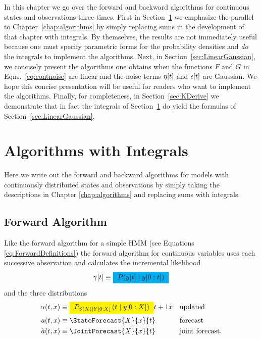 In this chapter we go over the forward and backward algorithms for
continuous states and observations three times.  First in
Section~\ref{sec:integrals} we emphasize the parallel to
Chapter~\ref{chap:algorithms} by simply replacing sums in the
development of that chapter with integrals.  By themselves, the
results are not immediately useful because one must specify parametric
forms for the probability densities and \emph{do} the integrals to
implement the algorithms.  Next, in Section~\ref{sec:LinearGaussian},
we concisely present the algorithms one obtains when the functions $F$
and $G$ in Eqns.~\eqref{eq:contnoise} are linear and the noise terms
${\eta}{[t]}$ and ${\epsilon}{[t]}$ are Gaussian.  We hope this
concise presentation will be useful for readers who want to implement
the algorithms.  Finally, for completeness, in
Section~\ref{sec:KDerive} we demonstrate that in fact the integrals of
Section~\ref{sec:integrals} do yield the formulas of
Section~\ref{sec:LinearGaussian}.

\section{Algorithms with Integrals}
\label{sec:integrals}

Here we write out the forward and backward algorithms for models with
continuously distributed states and observations by simply taking the
descriptions in Chapter \ref{chap:algorithms} and replacing sums with
integrals.

\subsection{Forward Algorithm}

Like the forward algorithm for a simple HMM (see Equations
\eqref{eq:ForwardDefinitions}) the forward algorithm for continuous
variables uses each successive observation and calculates the incremental
likelihood
\begin{equation*}
  \ti{\gamma}{t} \equiv \gammax
\end{equation*}
and the three distributions
\begin{align*}
  \alpha(t,x) &\equiv \alphax{X}{t}{t+1}{x} && \text{updated} \\
  a(t,x) &\equiv \StateForecast{X}{x}{t} && \text{forecast} \\
  \tilde a(t,x) &\equiv \JointForecast{X}{x}{t} && \text{joint forecast}.
\end{align*}


